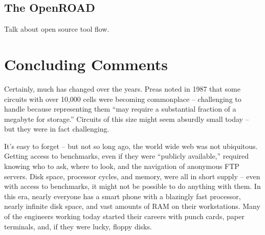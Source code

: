 \documentclass[sigconf]{acmart}
\begin{document}
\subsection{The OpenROAD}

Talk about open source tool flow.  

\cite{Ajayi19}




\section{Concluding Comments}

Certainly, much has changed over the years.  Preas\cite{Preas87}
noted in 1987 that some circuits with over 10,000 cells were becoming
commonplace -- challenging to handle because representing them
``may require a substantial fraction of a megabyte for storage.''
Circuits of this size might seem absurdly small today -- but they
were in fact challenging.

It's easy to forget -- but not so long ago, the
world wide web was not ubiquitous. Getting access to benchmarks, even if they
were ``publicly available,'' required knowing who to ask, where to
look, and the navigation of anonymous FTP servers.  Disk space,
processor cycles, and memory, were all in short supply -- even with
access to benchmarks, it might not be possible to do anything with them.
In this era, nearly everyone has a smart phone with a blazingly fast
processor, nearly infinite disk space, and vast amounts of
RAM on their workstations.  Many of the engineers
working today started their careers with punch cards,
paper terminals, and, if they were lucky, floppy disks.



\balance


\end{document}

